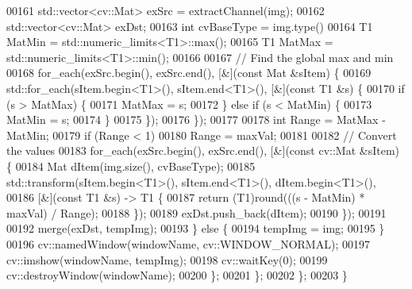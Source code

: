 \begin{DoxyCode}
00161         std::vector<cv::Mat> exSrc = extractChannel(img);
00162         std::vector<cv::Mat> exDst;
00163         \textcolor{keywordtype}{int} cvBaseType = img.type() %
00164         T1 MatMin = std::numeric\_limits<T1>::max();
00165         T1 MatMax = std::numeric\_limits<T1>::min();
00166 
00167         \textcolor{comment}{// Find the global max and min}
00168         for\_each(exSrc.begin(), exSrc.end(), [&](\textcolor{keyword}{const} Mat &sItem) \{
00169           std::for\_each(sItem.begin<T1>(), sItem.end<T1>(), [&](\textcolor{keyword}{const} T1 &s) \{
00170             if (s > MatMax) \{
00171               MatMax = s;
00172             \} \textcolor{keywordflow}{else} if (s < MatMin) \{
00173               MatMin = s;
00174             \}
00175           \});
00176         \});
00177 
00178         \textcolor{keywordtype}{int} Range = MatMax - MatMin;
00179         \textcolor{keywordflow}{if} (Range < 1)
00180           Range = maxVal;
00181 
00182         \textcolor{comment}{// Convert the values}
00183         for\_each(exSrc.begin(), exSrc.end(), [&](\textcolor{keyword}{const} cv::Mat &sItem) \{
00184           Mat dItem(img.size(), cvBaseType);
00185           std::transform(sItem.begin<T1>(), sItem.end<T1>(), dItem.begin<T1>(),
00186                          [&](\textcolor{keyword}{const} T1 &s) -> T1 \{
00187                            return (T1)round(((s - MatMin) * maxVal) / Range);
00188                          \});
00189           exDst.push\_back(dItem);
00190         \});
00191 
00192         merge(exDst, tempImg);
00193       \} \textcolor{keywordflow}{else} \{
00194         tempImg = img;
00195       \}
00196       cv::namedWindow(windowName, cv::WINDOW\_NORMAL);
00197       cv::imshow(windowName, tempImg);
00198       cv::waitKey(0);
00199       cv::destroyWindow(windowName);
00200     \};
00201   \};
00202 \};
00203 \}
\end{DoxyCode}
